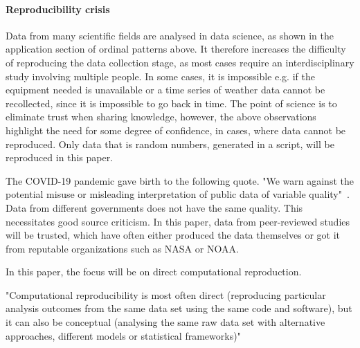 \paragraph{Reproducibility crisis}
Data from many scientific fields are analysed in data science, as shown in the application section of ordinal patterns above. It therefore increases the difficulty of reproducing the data collection stage, as most cases require an interdisciplinary study involving multiple people. In some cases, it is impossible e.g. if the equipment needed is unavailable or a time series of weather data cannot be recollected, since it is impossible to go back in time. The point of science is to eliminate trust when sharing knowledge, however, the above observations highlight the need for some degree of confidence, in cases, where data cannot be reproduced. Only data that is random numbers, generated in a script, will be reproduced in this paper.

The COVID-19 pandemic gave birth to the following quote. "We warn against the potential misuse or misleading interpretation of public data of variable quality"~\cite{Struelens2021}. Data from different governments does not have the same quality. This necessitates good source criticism. In this paper, data from peer-reviewed studies will be trusted, which have often either produced the data themselves or got it from reputable organizations such as NASA or NOAA. 

In this paper, the focus will be on direct computational reproduction.

"Computational reproducibility is most often direct (reproducing particular analysis outcomes from the same data set using the same code and software), but it can also be conceptual (analysing the same raw data set with alternative approaches, different models or statistical frameworks)"~\cite{Fidler2018}

